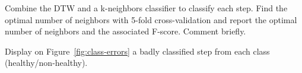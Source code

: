 \documentclass[11pt]{article}
\begin{document}
\begin{exercise}
Combine the DTW and a k-neighbors classifier to classify each step. Find the optimal number of neighbors with 5-fold cross-validation and report the optimal number of neighbors and the associated F-score. Comment briefly.
\end{exercise}

\begin{solution}

\end{solution}

\newpage
\begin{exercise}\label{q:class-errors}
Display on Figure~\ref{fig:class-errors} a badly classified step from each class (healthy/non-healthy).
\end{exercise}

\end{document}
